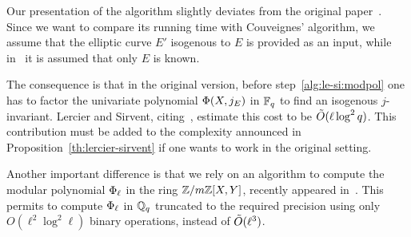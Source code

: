 \begin{remark}
  Our presentation of the algorithm slightly deviates from the
  original paper~\cite{lercier+sirvent08}. Since we want to compare
  its running time with Couveignes' algorithm, we assume that the
  elliptic curve $E'$ isogenous to $E$ is provided as an input, while
  in~\cite{lercier+sirvent08} it is assumed that only $E$ is known.

  The consequence is that in the original version, before
  step~\ref{alg:le-si:modpol} one has to factor the univariate
  polynomial $\Phi(X,j_E)$ in $\mathbb{F}_q$ to find an isogenous
  $j$-invariant. Lercier and Sirvent,
  citing~\cite{lidl+niederreiter:2}, estimate this cost to be
  $\tilde{O}(\ell\log^2 q)$. This contribution must be added to the
  complexity announced in Proposition~\ref{th:lercier-sirvent} if one
  wants to work in the original setting.

  Another important difference is that we rely on an algorithm to
  compute the modular polynomial $\Phi_\ell$ in the ring
  $\mathbb{Z}/m\mathbb{Z}[X,Y]$, recently appeared in~\cite{sutherland10:modpol}. This
  permits to compute $\Phi_\ell$ in $\mathbb{Q}_q$ truncated to the
  required precision using only $O(\ell^2\log^2\ell)$ binary
  operations, instead of $\tilde{O}(\ell^3)$.
\end{remark}



%
